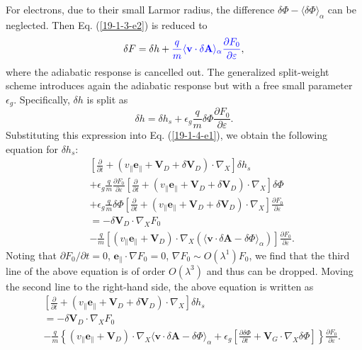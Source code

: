\documentclass{article}
\newcommand{\tmcolor}[2]{{\color{#1}{#2}}}
\begin{document}
For electrons, due to their small Larmor radius, the difference $\delta \Phi -
\langle \delta \Phi \rangle_{\alpha}$ can be neglected. Then Eq.
(\ref{19-1-3-e2}) is reduced to
\begin{equation}
  \delta F = \delta h + \tmcolor{blue}{\frac{q}{m} \langle \mathbf{v} \cdot
  \delta \mathbf{A} \rangle_{\alpha} \frac{\partial F_0}{\partial
  \varepsilon}},
\end{equation}
where the adiabatic response is cancelled out. The generalized split-weight
scheme introduces again the adiabatic response but with a free small parameter
$\epsilon_g$. Specifically, $\delta h$ is split as
\begin{equation}
  \delta h = \delta h_s + \epsilon_g \frac{q}{m} \delta \Phi \frac{\partial
  F_0}{\partial \varepsilon} .
\end{equation}
Substituting this expression into Eq. (\ref{19-1-4-e1}), we obtain the
following equation for $\delta h_s$:
\begin{eqnarray}
  &  & \left[ \frac{\partial}{\partial t} + (v_{\parallel}
  \mathbf{e}_{\parallel} +\mathbf{V}_D + \delta \mathbf{V}_D) \cdot \nabla_X
  \right] \delta h_s \nonumber\\
  &  & + \epsilon_g \frac{q}{m} \frac{\partial F_0}{\partial \varepsilon}
  \left[ \frac{\partial}{\partial t} + (v_{\parallel} \mathbf{e}_{\parallel}
  +\mathbf{V}_D + \delta \mathbf{V}_D) \cdot \nabla_X \right] \delta \Phi
  \nonumber\\
  &  & + \epsilon_g \frac{q}{m} \delta \Phi \left[ \frac{\partial}{\partial
  t} + (v_{\parallel} \mathbf{e}_{\parallel} +\mathbf{V}_D + \delta
  \mathbf{V}_D) \cdot \nabla_X \right] \frac{\partial F_0}{\partial
  \varepsilon} \nonumber\\
  &  & = - \delta \mathbf{V}_D \cdot \nabla_X F_0 \nonumber\\
  &  & - \frac{q}{m} [(v_{\parallel} \mathbf{e}_{\parallel} +\mathbf{V}_D)
  \cdot \nabla_X (\langle \mathbf{v} \cdot \delta \mathbf{A}- \delta \Phi
  \rangle_{\alpha})] \frac{\partial F_0}{\partial \varepsilon} . 
  \label{19-1-10-7m}
\end{eqnarray}
Noting that $\partial F_0 / \partial t = 0$, $\mathbf{e}_{\parallel} \cdot
\nabla F_0 = 0$, $\nabla F_0 \sim O (\lambda^1) F_0$, we find that the third
line of the above equation is of order $O (\lambda^3)$ and thus can be
dropped. Moving the second line to the right-hand side, the above equation is
written as
\begin{eqnarray}
  &  & \left[ \frac{\partial}{\partial t} + (v_{\parallel}
  \mathbf{e}_{\parallel} +\mathbf{V}_D + \delta \mathbf{V}_D) \cdot \nabla_X
  \right] \delta h_s \nonumber\\
  &  & = - \delta \mathbf{V}_D \cdot \nabla_X F_0 \nonumber\\
  &  & - \frac{q}{m} \left\{ (v_{\parallel} \mathbf{e}_{\parallel}
  +\mathbf{V}_D) \cdot \nabla_X \langle \mathbf{v} \cdot \delta \mathbf{A}-
  \delta \Phi \rangle_{\alpha} + \epsilon_g \left[ \frac{\partial \delta
  \Phi}{\partial t} +\mathbf{V}_G \cdot \nabla_X \delta \Phi \right] \right\}
  \frac{\partial F_0}{\partial \varepsilon} .  \label{19-1-10-7}
\end{eqnarray}
\end{document}
